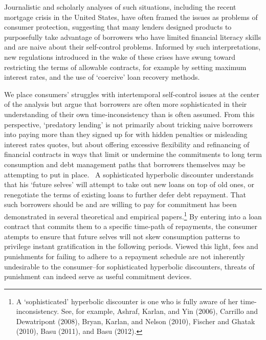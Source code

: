 \documentclass[11pt]{article}%
\begin{document}
Journalistic and scholarly analyses of such situations, including the recent
mortgage crisis in the United States, have often framed the issues as problems
of consumer protection, suggesting that many lenders designed products to
purposefully take advantage of borrowers who have limited financial literacy
skills and are naive about their self-control problems. Informed by such
interpretations, new regulations introduced in the wake of these crises have
swung toward restricting the terms of allowable contracts, for example by
setting maximum interest rates, and the use of `coercive' loan recovery methods.

We place consumers' struggles with intertemporal self-control issues at the
center of the analysis but argue that borrowers are often more sophisticated
in their understanding of their own time-inconsistency than is often assumed.
From this perspective, `predatory lending' is not primarily about tricking
naive borrowers into paying more than they signed up for with hidden penalties
or misleading interest rates quotes, but about offering excessive flexibility
and refinancing of financial contracts in ways that limit or undermine the
commitments to long term consumption and debt management paths that borrowers
themselves may be attempting to put in place. \ A sophisticated hyperbolic
discounter understands that his `future selves' will attempt to take out new
loans on top of old ones, or renegotiate the terms of existing loans to
further defer debt repayment. That such borrowers should be and are willing to
pay for commitment has been demonstrated in several theoretical and empirical
papers.\footnote{%
A `sophisticated' hyperbolic discounter is one who is fully
aware of her time-inconsistency. See, for example, Ashraf, Karlan, and Yin
(2006), Carrillo and Dewatripont (2008), Bryan, Karlan, and Nelson (2010),
Fischer and Ghatak (2010), Basu (2011), and Basu (2012).} By entering into a
loan contract that commits them to a specific time-path of repayments, the
consumer atempts to ensure that future selves will not skew consumption
patterns to privilege instant gratification in the following periods. Viewed
this light, fees and punishments for failing to adhere to a repayment schedule
are not inherently undesirable to the consumer--for sophisticated hyperbolic
discounters, threats of punishment can indeed serve as useful commitment devices.
\end{document}
